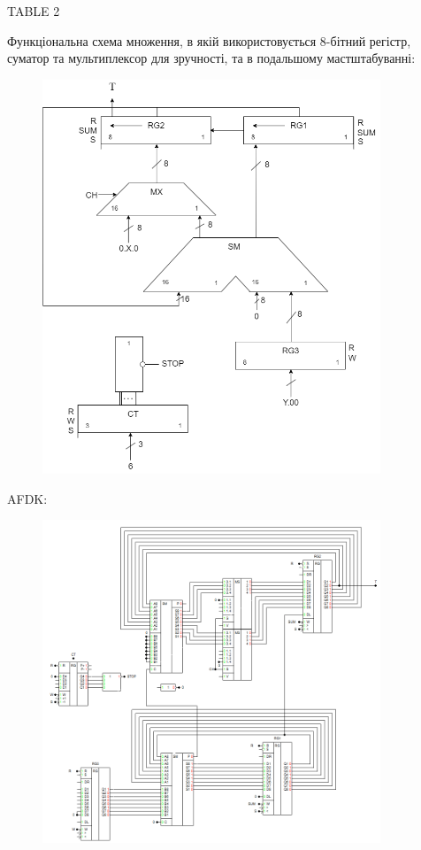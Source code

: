 \documentclass[12pt,a4paper]{article}
\begin{document}
    \newpage

    TABLE 2

    \newpage

    Функціональна схема множення, в якій використовується 8-бітний регістр, суматор та мультиплексор для зручності, та в подальшому мастштабуванні:

    \begin{figure}[ht]
        \includegraphics[width=0.9\textwidth]{multiply3_function_schemma.png}
    \end{figure}

    \newpage

    AFDK:

    \begin{figure}[ht]
        \includegraphics[width=0.9\textwidth]{schemma2.png}
    \end{figure}
\end{document}
